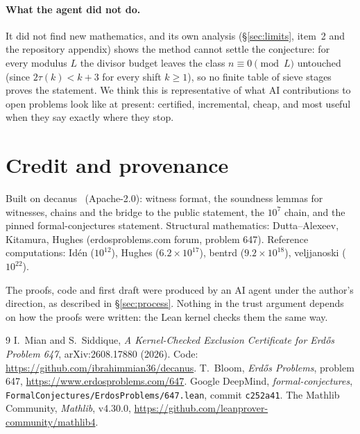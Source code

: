 \documentclass[11pt]{article}
\begin{document}
\paragraph{What the agent did not do.} It did not find new mathematics, and its own analysis (\S\ref{sec:limits}, item~2 and the repository appendix) shows the method cannot settle the conjecture: for every modulus $L$ the divisor budget leaves the class $n\equiv0\pmod L$ untouched (since $2\tau(k)<k+3$ for every shift $k\ge1$), so no finite table of sieve stages proves the statement. We think this is representative of what AI contributions to open problems look like at present: certified, incremental, cheap, and most useful when they say exactly where they stop.

\section*{Credit and provenance}

Built on decanus~\cite{decanus} (Apache-2.0): witness format, the soundness lemmas for witnesses, chains and the bridge to the public statement, the $10^{7}$ chain, and the pinned formal-conjectures statement. Structural mathematics: Dutta--Alexeev, Kitamura, Hughes (erdosproblems.com forum, problem 647). Reference computations: Id\'en ($10^{12}$), Hughes ($6.2\times10^{17}$), bentrd ($9.2\times10^{18}$), veljjanoski ($10^{22}$).

The proofs, code and first draft were produced by an AI agent under the author's direction, as described in \S\ref{sec:process}. Nothing in the trust argument depends on how the proofs were written: the Lean kernel checks them the same way.

\begin{thebibliography}{9}
 I.~Mian and S.~Siddique, \emph{A Kernel-Checked Exclusion Certificate for Erd\H{o}s Problem 647}, arXiv:2608.17880 (2026). Code: \url{https://github.com/ibrahimmian36/decanus}.
 T.~Bloom, \emph{Erd\H{o}s Problems}, problem 647, \url{https://www.erdosproblems.com/647}.
 Google DeepMind, \emph{formal-conjectures}, \texttt{FormalConjectures/ErdosProblems/647.lean}, commit \texttt{c252a41}.
 The Mathlib Community, \emph{Mathlib}, v4.30.0, \url{https://github.com/leanprover-community/mathlib4}.
\end{thebibliography}
\end{document}
